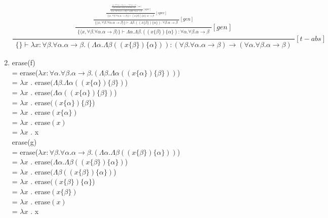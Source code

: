 \documentclass[onecolumn,11pt]{article}
\newcommand{\post}[2]{\ensuremath{\frac{\begin{array}{c}#1\end{array}}{\begin{array}{c}#2\end{array}}}}
\begin{document}
\begin{enumerate}
\[
\post
{ \post
  { \post
    { \post
      { \post
        { \post
          { \{\langle x, \forall \beta. \forall \alpha. \alpha \rightarrow \beta \rangle \}(x)  = \forall \beta. \forall \alpha. \alpha \rightarrow \beta }
          { \{\langle x, \forall \beta. \forall \alpha. \alpha \rightarrow \beta \rangle \} \vdash x : \forall \beta. \forall \alpha . \alpha \rightarrow \beta } [var]
        } 
        { \{\langle x, \forall \beta. \forall \alpha. \alpha \rightarrow \beta \rangle \} \vdash x\{\beta\} : \forall \alpha.\alpha \rightarrow \beta } [spec]
      }
      { \{\langle x, \forall \beta. \forall \alpha. \alpha \rightarrow \beta \rangle \} \vdash (x\{\beta\})\{\alpha\} : \alpha \rightarrow \beta } [spec]
    }
    { \{\langle x, \forall \beta. \forall \alpha. \alpha \rightarrow \beta \rangle \} \vdash \Lambda \beta . ((x\{\beta\})\{\alpha\}) : \forall \beta . \alpha \rightarrow \beta } [gen]
  }
 { \{\langle x, \forall \beta. \forall \alpha. \alpha \rightarrow \beta \rangle \} \vdash \Lambda \alpha. \Lambda \beta. ((x\{\beta\})\{\alpha\}) : \forall \alpha. \forall \beta. \alpha \rightarrow \beta } [gen]
}
{ \{\} \vdash \lambda x : \forall \beta . \forall \alpha. \alpha \rightarrow \beta. (\Lambda \alpha. \Lambda \beta ((x\{\beta\})\{\alpha\})): (\forall \beta . \forall \alpha . \alpha \rightarrow \beta) \rightarrow (\forall \alpha. \forall \beta. \alpha \rightarrow \beta) } [t-abs]
\]

\newpage

\item

erase(f) \\
= erase($\lambda x : \forall \alpha . \forall \beta. \alpha \rightarrow \beta. (\Lambda \beta. \Lambda \alpha ((x\{\alpha\})\{\beta\}))$) \\
= $\lambda x$ . erase$(\Lambda \beta. \Lambda \alpha ((x\{\alpha\})\{\beta\})$) \\
= $\lambda x$ . erase$(\Lambda \alpha ((x\{\alpha\})\{\beta\})$) \\
= $\lambda x$ . erase$((x\{\alpha\})\{\beta\}$) \\
= $\lambda x$ . erase$(x\{\alpha\})$ \\
= $\lambda x$ . erase$(x)$ \\
= $\lambda x$ . x \\

erase(g) \\
= erase($\lambda x : \forall \beta. \forall \alpha. \alpha \rightarrow \beta. (\Lambda \alpha. \Lambda \beta ((x\{\beta\})\{\alpha\}))$) \\
= $\lambda x$ . erase$(\Lambda \alpha. \Lambda \beta ((x\{\beta\})\{\alpha\})$) \\
= $\lambda x$ . erase$(\Lambda \beta ((x\{\beta\})\{\alpha\})$) \\
= $\lambda x$ . erase$((x\{\beta\})\{\alpha\}$) \\
= $\lambda x$ . erase$(x\{\beta\})$ \\
= $\lambda x$ . erase$(x)$ \\
= $\lambda x$ . x \\


\end{enumerate}
\end{document}
